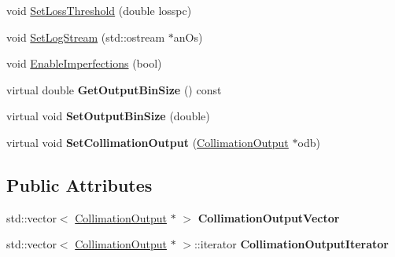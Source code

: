 \begin{DoxyCompactItemize}
void \hyperlink{classParticleTracking_1_1CollimateParticleProcess_ae00a6eaeda4b46eb25a1bc28e399b4f8}{Set\+Loss\+Threshold} (double losspc)
\item 
void \hyperlink{classParticleTracking_1_1CollimateParticleProcess_af9bcc2aff428281af1d79011d6978685}{Set\+Log\+Stream} (std\+::ostream $\ast$an\+Os)
\item 
void \hyperlink{classParticleTracking_1_1CollimateParticleProcess_a12c96ec3f91752f211c135f96ba2248c}{Enable\+Imperfections} (bool)
\item 
\mbox{\label{classParticleTracking_1_1CollimateParticleProcess_a5fb0f7680678f9301a7328012b4ca345}} 
virtual double {\bfseries Get\+Output\+Bin\+Size} () const
\item 
\mbox{\label{classParticleTracking_1_1CollimateParticleProcess_aa615fc6c8eb385a5a1d7ff563b64571f}} 
virtual void {\bfseries Set\+Output\+Bin\+Size} (double)
\item 
\mbox{\label{classParticleTracking_1_1CollimateParticleProcess_ac996f3bfacd5358da92209ca517bf4e3}} 
virtual void {\bfseries Set\+Collimation\+Output} (\hyperlink{classParticleTracking_1_1CollimationOutput}{Collimation\+Output} $\ast$odb)
\end{DoxyCompactItemize}
\subsection*{Public Attributes}
\begin{DoxyCompactItemize}
\item 
\mbox{\label{classParticleTracking_1_1CollimateParticleProcess_a4f49392ff553cbadb600c5813ee26c76}} 
std\+::vector$<$ \hyperlink{classParticleTracking_1_1CollimationOutput}{Collimation\+Output} $\ast$ $>$ {\bfseries Collimation\+Output\+Vector}
\item 
\mbox{\label{classParticleTracking_1_1CollimateParticleProcess_a1da526fdda9ded05c1fa0e6127a6ae85}} 
std\+::vector$<$ \hyperlink{classParticleTracking_1_1CollimationOutput}{Collimation\+Output} $\ast$ $>$\+::iterator {\bfseries Collimation\+Output\+Iterator}
\end{DoxyCompactItemize}
